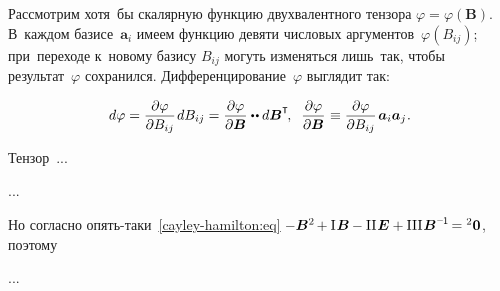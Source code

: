 \begin{otherlanguage}{russian}

Рассмотрим хотя~бы скалярную функцию двухвалентного тензора ${\varphi \!=\! \varphi(\bm{B})}$. В~каждом базисе~${\bm{a}_i}$ имеем функцию девяти числовых аргументов~${\varphi(B_{ij})}$; при~переходе к~новому базису ${B_{ij}}$ могуть изменяться лишь~так, чтобы результат~$\varphi$ сохранился. Дифференцирование~$\varphi$ выглядит так:

\nopagebreak\vspace{-0.1em}\begin{equation}
d \varphi = \displaystyle \frac{\partial \varphi}{\partial B_{ij}} \hspace{0.2ex} d B_{ij} = \displaystyle \frac{\partial \varphi}{\partial \bm{B}} \dotdotp d \bm{B}^{\T} \hspace{-0.25ex} , \;\;
\displaystyle \frac{\partial \varphi}{\partial \bm{B}} \hspace{0.1ex} \equiv \displaystyle \frac{\partial \varphi}{\partial B_{ij}} \hspace{0.25ex} \bm{a}_i \bm{a}_j \hspace{0.1ex}.
\end{equation}

Тензор~...

...

Но согласно опять\hbox{-}таки~\eqref{cayley-hamilton:eq}
${\hspace{-0.1ex} -\bm{B}^{2} \hspace{-0.2ex} + \mathrm{I}\hspace{0.16ex} \bm{B} \hspace{-0.1ex} - \mathrm{II}\hspace{0.16ex} \bm{E} + \mathrm{III}\hspace{0.16ex} \bm{B}^{\expminusone} \hspace{-0.25ex} = {^2\bm{0}}}$, поэтому

...




\end{otherlanguage}
